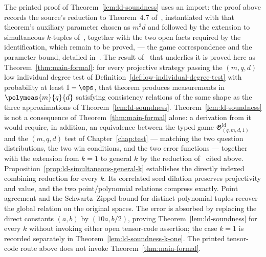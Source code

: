 \begin{remark}\label{rem:ld-soundness-provider}
	The printed proof of Theorem~\ref{lem:ld-soundness} uses an import: the proof above records the source's reduction to Theorem~4.7 of~\cite{Ji2021Quantum}, instantiated with that theorem's auxiliary parameter chosen as $m^3 d$ and followed by the extension to simultaneous $k$-tuples of~\cite{Natarajan2018NEEXP}, together with the two open facts required by the identification, which remain to be proved, --- the game correspondence and the parameter bound, detailed in~\cite{gap:qpbt_ld-dimension-divisibility}. The result of~\cite{Ji2020LowIndividualDegree} that underlies it is proved here as Theorem~\ref{thm:main-formal}: for every projective strategy passing the $(m,q,d)$ low individual degree test of Definition~\ref{def:low-individual-degree-test} with probability at least $1-\eps$, that theorem produces measurements in $\polymeas{m}{q}{d}$ satisfying consistency relations of the same shape as the three approximations of Theorem~\ref{lem:ld-soundness}. Theorem~\ref{lem:ld-soundness} is not a consequence of Theorem~\ref{thm:main-formal} alone: a derivation from it would require, in addition, an equivalence between the typed game $\mathfrak{G}^{\mathrm{ld}}_{(q,m,d,1)}$ and the $(m,q,d)$ test of Chapter~\ref{chap:test} --- matching the two question distributions, the two win conditions, and the two error functions --- together with the extension from $k = 1$ to general $k$ by the reduction of~\cite{Natarajan2018NEEXP} cited above. Proposition~\ref{prop:ld-simultaneous-general-k} establishes the directly indexed combining reduction for every $k$. Its correlated seed dilation preserves projectivity and value, and the two point/polynomial relations compress exactly. Point agreement and the Schwartz--Zippel bound for distinct polynomial tuples recover the global relation on the original spaces. The error is absorbed by replacing the direct constants $(a,b)$ by $(10a,b/2)$, proving Theorem~\ref{lem:ld-soundness} for every $k$ without invoking either open tensor-code assertion; the case $k=1$ is recorded separately in Theorem~\ref{lem:ld-soundness-k-one}. The printed tensor-code route above does not invoke Theorem~\ref{thm:main-formal}.
\end{remark}

